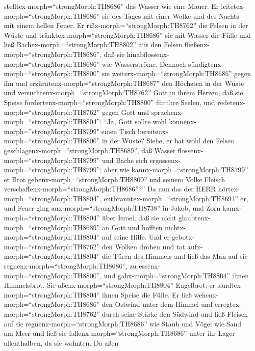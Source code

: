 stelltex-morph=``strongMorph:TH8686'' das Wasser wie eine Mauer.
 Er leitetex-morph=``strongMorph:TH8686'' sie des Tages mit
einer Wolke und des Nachts mit einem hellen Feuer.  Er
rißx-morph=``strongMorph:TH8762'' die Felsen in der Wüste und
tränktex-morph=``strongMorph:TH8686'' sie mit Wasser die Fülle
 und ließ Bächex-morph=``strongMorph:TH8802'' aus den
Felsen fließenx-morph=``strongMorph:TH8686'', daß sie
hinabflossenx-morph=``strongMorph:TH8686'' wie Wasserströme.
 Dennoch sündigtenx-morph=``strongMorph:TH8800'' sie
weiterx-morph=``strongMorph:TH8686'' gegen ihn und
erzürntenx-morph=``strongMorph:TH8687'' den Höchsten in der Wüste
 und versuchtenx-morph=``strongMorph:TH8762'' Gott in ihrem
Herzen, daß sie Speise fordertenx-morph=``strongMorph:TH8800'' für ihre
Seelen,  und redetenx-morph=``strongMorph:TH8762'' gegen
Gott und sprachenx-morph=``strongMorph:TH8804'': ``Ja, Gott sollte wohl
könnenx-morph=''strongMorph:TH8799" einen Tisch
bereitenx-morph=``strongMorph:TH8800'' in der Wüste? 
Siehe, er hat wohl den Felsen geschlagenx-morph=``strongMorph:TH8689'',
daß Wasser flossenx-morph=``strongMorph:TH8799'' und Bäche sich
ergossenx-morph=``strongMorph:TH8799''; aber wie
kannx-morph=``strongMorph:TH8799'' er Brot
gebenx-morph=``strongMorph:TH8800'' und seinem Volke Fleisch
verschaffenx-morph=``strongMorph:TH8686''?''  Da nun das
der HERR hörtex-morph=``strongMorph:TH8804'',
entbranntex-morph=``strongMorph:TH8691'' er, und Feuer ging
anx-morph=``strongMorph:TH8738'' in Jakob, und Zorn
kamx-morph=``strongMorph:TH8804'' über Israel,  daß sie
nicht glaubtenx-morph=``strongMorph:TH8689'' an Gott und hofften
nichtx-morph=``strongMorph:TH8804'' auf seine Hilfe.  Und
er gebotx-morph=``strongMorph:TH8762'' den Wolken droben und tat
aufx-morph=``strongMorph:TH8804'' die Türen des Himmels 
und ließ das Man auf sie regnenx-morph=``strongMorph:TH8686'', zu
essenx-morph=``strongMorph:TH8800'', und
gabx-morph=``strongMorph:TH8804'' ihnen Himmelsbrot.  Sie
aßenx-morph=``strongMorph:TH8804'' Engelbrot; er
sandtex-morph=``strongMorph:TH8804'' ihnen Speise die Fülle.
 Er ließ wehenx-morph=``strongMorph:TH8686'' den Ostwind
unter dem Himmel und erregtex-morph=``strongMorph:TH8762'' durch seine
Stärke den Südwind  und ließ Fleisch auf sie
regnenx-morph=``strongMorph:TH8686'' wie Staub und Vögel wie Sand am
Meer  und ließ sie fallenx-morph=``strongMorph:TH8686''
unter ihr Lager allenthalben, da sie wohnten.  Da aßen
